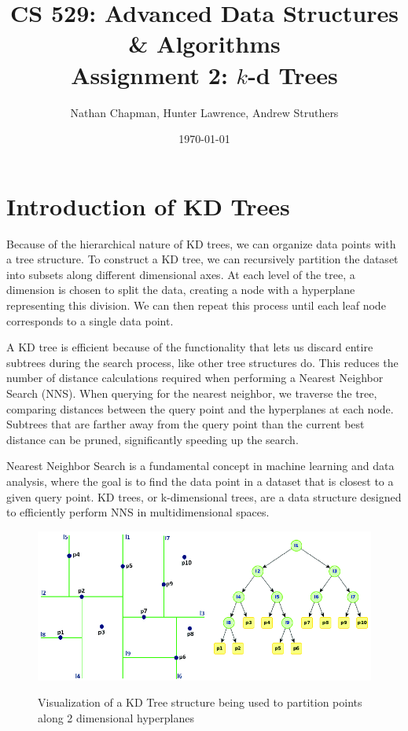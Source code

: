 \documentclass{article}
\title{\vspace*{-0.625in}CS 529: Advanced Data Structures \& Algorithms \\ Assignment 2: $k$-d Trees}
\author{Nathan Chapman, Hunter Lawrence, Andrew Struthers}
\date{\today}
\begin{document}
    \maketitle
    \section*{Introduction of KD Trees}
Because of the hierarchical nature of KD trees, we can organize data points with a tree structure. To construct a KD tree, we can recursively partition the dataset into subsets along different dimensional axes. At each level of the tree, a dimension is chosen to split the data, creating a node with a hyperplane representing this division. We can then repeat this process until each leaf node corresponds to a single data point.

A KD tree is efficient because of the functionality that lets us discard entire subtrees during the search process, like other tree structures do. This reduces the number of distance calculations required when performing a Nearest Neighbor Search (NNS). When querying for the nearest neighbor, we traverse the tree, comparing distances between the query point and the hyperplanes at each node. Subtrees that are farther away from the query point than the current best distance can be pruned, significantly speeding up the search.

Nearest Neighbor Search is a fundamental concept in machine learning and data analysis, where the goal is to find the data point in a dataset that is closest to a given query point. KD trees, or k-dimensional trees, are a data structure designed to efficiently perform NNS in multidimensional spaces.

\begin{figure}[h]
    \centering
    \includegraphics[width=\textwidth,keepaspectratio]{Images/space_partition.png}
    \label{fig:space_partition}
    \caption{Visualization of a KD Tree structure being used to partition points along 2 dimensional hyperplanes}
\end{figure}
\end{document}
